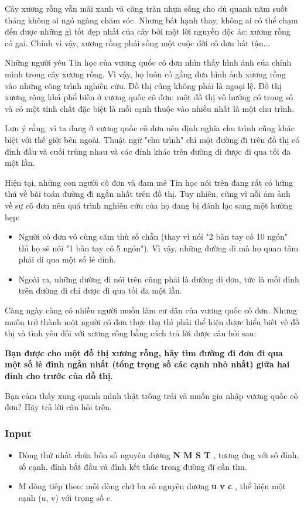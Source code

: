 



Cây xương rồng vẫn mãi xanh và căng tràn nhựa sống cho dù quanh năm suốt tháng không ai ngó ngàng chăm sóc. Nhưng bất hạnh thay, không ai có thể chạm đến được những gì tốt đẹp nhất của cây bởi một lời nguyền độc ác: xương rồng có gai. Chính vì vậy, xương rồng phải sống một cuộc đời cô đơn bất tận...

   Những người yêu Tin học của vương quốc cô đơn nhìn thấy hình ảnh của chính mình trong cây xương rồng. Vì vậy, họ luôn cố gắng đưa hình ảnh xương rồng vào những công trình nghiên cứu. Đồ thị cũng không phải là ngoại lệ. Đồ thị xương rồng khá phổ biến ở vương quốc cô đơn: một đồ thị vô hướng có trọng số và có một tính chất đặc biệt là mỗi cạnh thuộc vào nhiều nhất là một chu trình.  

   Lưu ý rằng, vì ta đang ở vương quốc cô đơn nên định nghĩa chu trình cũng khác biệt với thế giới bên ngoài. Thuật ngữ "chu trình" chỉ một đường đi trên đồ thị có đỉnh đầu và cuối trùng nhau và các đỉnh khác trên đường đi được đi qua tối đa một lần.  

   Hiện tại, những con người cô đơn và đam mê Tin học nói trên đang rất có hứng thú về bài toán đường đi ngắn nhất trên đồ thị. Tuy nhiên, cũng vì nỗi ảm ảnh về sự cô đơn nên quá trình nghiên cứu của họ đang bị đánh lạc sang một hướng hẹp:  
\begin{itemize}
	\item     Người cô đơn vô cùng căm thù số chẵn (thay vì nói "2 bàn tay có 10 ngón" thì họ sẽ nói "1 bàn tay có 5 ngón"). Vì vậy, những đường đi mà họ quan tâm phải đi qua một số lẻ đỉnh.   
	\item     Ngoài ra, những đường đi nói trên cũng phải là đường đi đơn, tức là mỗi đỉnh trên đường đi chỉ được đi qua tối đa một lần.   
\end{itemize}

   Càng ngày càng có nhiều người muốn làm cư dân của vương quốc cô đơn. Nhưng muốn trở thành một người cô đơn thực thụ thì phải thể hiện được hiểu biết về đồ thị và tình yêu đối với xương rồng bằng cách trả lời được câu hỏi sau:  

\textbf{Bạn được cho một đồ thị xương rồng, hãy tìm đường đi đơn đi qua một số lẻ đỉnh ngắn nhất (tổng trọng số các cạnh nhỏ nhất) giữa hai đỉnh cho trước của đồ thị.}

   Bạn cảm thấy xung quanh mình thật trống trải và muốn gia nhập vương quốc cô đơn? Hãy trả lời câu hỏi trên.  

\subsubsection{   Input  }
\begin{itemize}
	\item     Dòng thứ nhất chứa bốn số nguyên dương    \textbf{     N M S T    }    , tương ứng với số đỉnh, số cạnh, đỉnh bắt đầu và đỉnh kết thúc trong đường đi cần tìm.   
	\item     M dòng tiếp theo: mỗi dòng chứ ba số nguyên dương    \textbf{     u v c    }    , thể hiện một cạnh (u, v) với trọng số c.   
\end{itemize}


